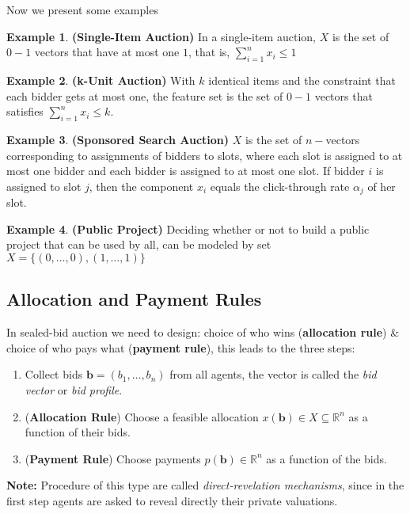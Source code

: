 \documentclass[10pt]{article}
\def\R{\mathbb{R}}
\theoremstyle{definition}
\newtheorem{example}{Example}[section]
\newcommand{\Note}[0]{\noindent\textbf{Note: }}
\begin{document}
Now we present some examples

\begin{example} \textbf{(Single-Item Auction)}
	In a single-item auction, $X$ is the set of $0-1$ vectors that have at most one $1$, that is, $\sum_{i=1}^{n}x_{i} \le 1$
\end{example}

\begin{example} \textbf{(k-Unit Auction)}
	With $k$ identical items and the constraint that each bidder gets at most one,
	the feature set is the set of $0-1$ vectors that satisfies $\sum_{i=1}^{n}x_{i} \le k$.
\end{example}

\begin{example} \textbf{(Sponsored Search Auction)}
	$X$ is the set of $n-$vectors corresponding to assignments of bidders to slots, where each slot is assigned to at most one bidder
	and each bidder is assigned to at most one slot. If bidder $i$ is assigned to slot $j$, then the component $x_{i}$ equals the click-through
	rate $\alpha_{j}$ of her slot.
\end{example}

\begin{example} \textbf{(Public Project)}
	Deciding whether or not to build a public project that can be used by all,
	can be modeled by set $X = \{(0, \dots, 0), (1, \dots, 1) \}$
\end{example}

\subsection{Allocation and Payment Rules}
In sealed-bid auction we need to design: choice of who wins (\textbf{allocation rule}) \& choice of who pays what (\textbf{payment rule}),
this leads to the three steps:
\begin{enumerate}
	\item Collect bids $\textbf{b} = (b_{1}, \dots, b_{n})$ from all agents,
	      the vector is called the \textit{bid vector} or \textit{bid profile}.
	\item (\textbf{Allocation Rule}) Choose a feasible allocation $x(\textbf{b}) \in X \subseteq \R^n$ as a function of their bids.
	\item (\textbf{Payment Rule}) Choose payments $p(\textbf{b}) \in \R^n$ as a function of the bids.
\end{enumerate}

\Note Procedure of this type are called \textit{direct-revelation mechanisms},
since in the first step agents are asked to reveal directly their private valuations.\\
\end{document}
